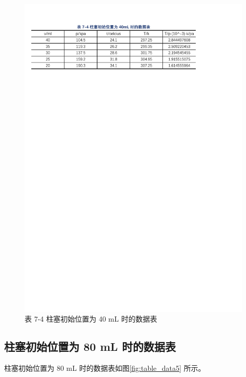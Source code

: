 \documentclass[12pt]{article}
\begin{document}
\begin{figure}[H] %
    \centering
    \includegraphics[width=\textwidth]{./figures/T7-4.pdf} 
    \caption{表 7-4 柱塞初始位置为 40 mL 时的数据表}
    \label{fig:table_data4}
\end{figure}

\subsection{\normalfont 柱塞初始位置为 80 mL 时的数据表}

柱塞初始位置为 80 mL 时的数据表如图\ref{fig:table_data5} 所示。
\end{document}
